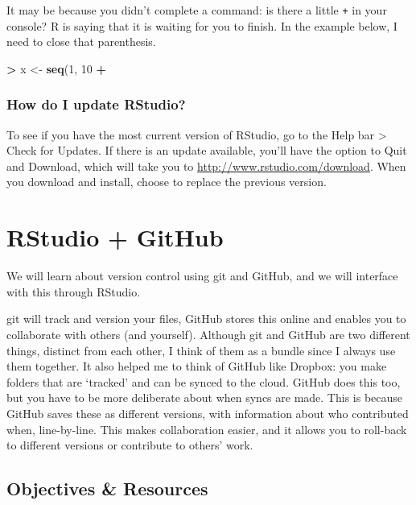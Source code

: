 \documentclass[]{book}
\newenvironment{Shaded}{\begin{snugshade}}{\end{snugshade}}
\newcommand{\KeywordTok}[1]{\textcolor[rgb]{0.13,0.29,0.53}{\textbf{#1}}}
\newcommand{\DecValTok}[1]{\textcolor[rgb]{0.00,0.00,0.81}{#1}}
\newcommand{\StringTok}[1]{\textcolor[rgb]{0.31,0.60,0.02}{#1}}
\newcommand{\OperatorTok}[1]{\textcolor[rgb]{0.81,0.36,0.00}{\textbf{#1}}}
\newcommand{\NormalTok}[1]{#1}
\theoremstyle{definition}
\theoremstyle{definition}
\theoremstyle{definition}
\theoremstyle{remark}
\begin{document}
It may be because you didn't complete a command: is there a little
\texttt{+} in your console? R is saying that it is waiting for you to
finish. In the example below, I need to close that parenthesis.

\begin{Shaded}
\begin{Highlighting}[]
\OperatorTok{>}\StringTok{ }\NormalTok{x <-}\StringTok{ }\KeywordTok{seq}\NormalTok{(}\DecValTok{1}\NormalTok{, }\DecValTok{10}
\OperatorTok{+}\StringTok{ }
\end{Highlighting}
\end{Shaded}

\subsection{How do I update RStudio?}\label{how-do-i-update-rstudio}

To see if you have the most current version of RStudio, go to the Help
bar \textgreater{} Check for Updates. If there is an update available,
you'll have the option to Quit and Download, which will take you to
\url{http://www.rstudio.com/download}. When you download and install,
choose to replace the previous version.

\chapter{RStudio + GitHub}\label{rstudio-github}

We will learn about version control using git and GitHub, and we will
interface with this through RStudio.

git will track and version your files, GitHub stores this online and
enables you to collaborate with others (and yourself). Although git and
GitHub are two different things, distinct from each other, I think of
them as a bundle since I always use them together. It also helped me to
think of GitHub like Dropbox: you make folders that are `tracked' and
can be synced to the cloud. GitHub does this too, but you have to be
more deliberate about when syncs are made. This is because GitHub saves
these as different versions, with information about who contributed
when, line-by-line. This makes collaboration easier, and it allows you
to roll-back to different versions or contribute to others' work.

\section{Objectives \& Resources}\label{objectives-resources}
\end{document}
